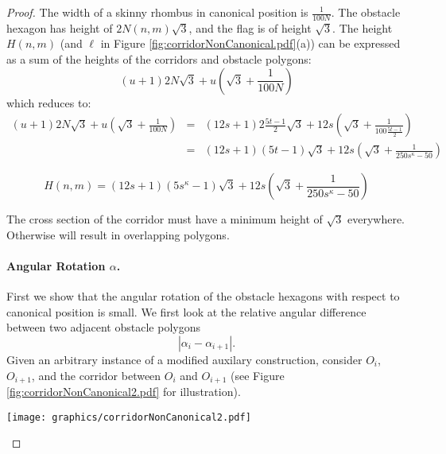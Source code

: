 \documentclass[10pt]{CSUNthesis}
\theoremstyle{plain}%
\theoremstyle{definition}
\theoremstyle{remark}
\newcommand{\lr}[1]{\left( #1 \right)}
\begin{document}
\begin{proof}
The width of a skinny rhombus in canonical position is $\frac{1}{100N}$.
The obstacle hexagon has height of $ 2 N(n,m) \sqrt{3}$, and the flag is of height $\sqrt{3}$. 
The height $H(n,m)$ (and $\ell$ in Figure \ref{fig:corridorNonCanonical.pdf}(a)) can be expressed as a sum of the heights of the corridors and obstacle polygons:
$$(u+1) 2 N \sqrt{3} + u \lr{\sqrt{3}+ \frac{1}{100N}}$$
which reduces to:
\begin{eqnarray*}
(u+1) 2 N  \sqrt{3} + u \lr{\sqrt{3}+ \frac{1}{100N}}&=&(12s+1) 2 \frac{5t-1}{2}  \sqrt{3} + 12s \lr{\sqrt{3}+ \frac{1}{100\frac{5t-1}{2}}}\\
&=&(12s+1)  (5t-1)  \sqrt{3} + 12s \lr{\sqrt{3}+ \frac{1}{250s^\kappa-50}}
\end{eqnarray*}

\begin{equation}\label{eqn:Hnm}
	H(n,m) = (12s+1)  \lr{5s^\kappa -1}  \sqrt{3} + 12s \lr{\sqrt{3}+ \frac{1}{250s^\kappa -50}}				
\end{equation}

The cross section of the corridor must have a minimum height of $\sqrt{3}$ everywhere.
Otherwise will result in overlapping polygons.\paragraph{Angular Rotation $\alpha$.}
First we show that the angular rotation of the obstacle hexagons with respect to canonical position is small.  
We first look at the relative angular difference between two adjacent obstacle polygons
$$\left\vert \alpha_i - \alpha_{i+1} \right\vert.$$
Given an arbitrary instance of a modified auxilary construction, consider $O_i$, $O_{i+1}$, and the corridor between $O_i$ and $O_{i+1}$ (see Figure \ref{fig:corridorNonCanonical2.pdf} for illustration).

\begin{minipage}{\linewidth}
\begin{center}
\texttt{[image: graphics/corridorNonCanonical2.pdf]}
\label{fig:corridorNonCanonical2.pdf}
\end{center}
\end{minipage}


\end{proof}
\end{document}
